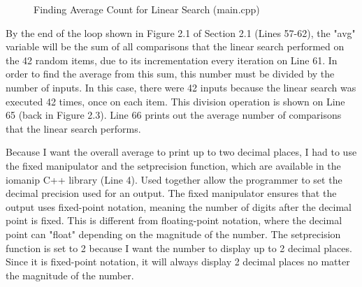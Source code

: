 \documentclass[letterpaper, 10pt]{article}
\begin{document}
\begin{figure}[H]
  \centering
   
  \label{fig:figure2.3-part1}
\end{figure}

\vspace{-3em}
\begin{figure}[H]
  \centering
   
  \label{fig:figure2.3-part2}
\end{figure}

\vspace{-3em}
\begin{figure}[H]
  \centering
   
  \caption{Finding Average Count for Linear Search (main.cpp)}
  \label{fig:figure2.3-part3}
\end{figure}

\noindent
By the end of the loop shown in Figure 2.1 of Section 2.1 (Lines 57-62), the "avg" variable will be the sum of all comparisons that the linear search performed on the 42 random items, due to its incrementation every iteration on Line 61. In order to find the average from this sum, this number must be divided by the number of inputs. In this case, there were 42 inputs because the linear search was executed 42 times, once on each item. This division operation is shown on Line 65 (back in Figure 2.3). Line 66 prints out the average number of comparisons that the linear search performs. 

\vspace{1em}

\noindent
Because I want the overall average to print up to two decimal places, I had to use the fixed manipulator and the setprecision function, which are available in the iomanip C++ library (Line 4). Used together allow the programmer to set the decimal precision used for an output. The fixed manipulator ensures that the output uses fixed-point notation, meaning the number of digits after the decimal point is fixed. This is different from floating-point notation, where the decimal point can "float" depending on the magnitude of the number. The setprecision function is set to 2 because I want the number to display up to 2 decimal places. Since it is fixed-point notation, it will always display 2 decimal places no matter the magnitude of the number.

\vspace{1em}
\end{document}

